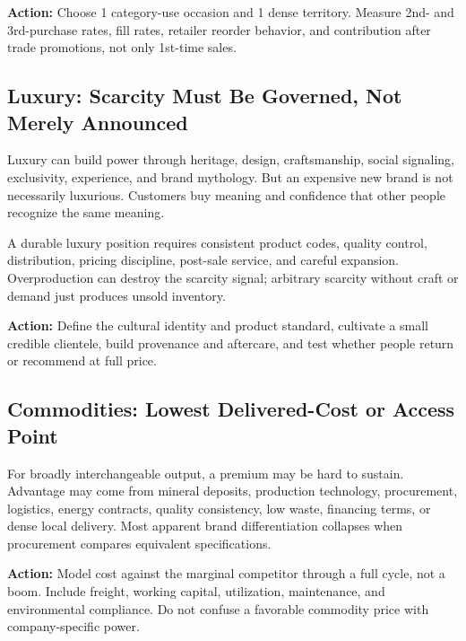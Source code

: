 \vspace{0.5em}
\noindent\textbf{Action:} Choose 1 category-use occasion and 1 dense territory. Measure 2nd- and 3rd-purchase rates, fill rates, retailer reorder behavior, and contribution after trade promotions, not only 1st-time sales.

\subsection{Luxury: Scarcity Must Be Governed, Not Merely Announced}
\label{sec:luxury_scarcity_governed}

Luxury can build power through heritage, design, craftsmanship, social signaling, exclusivity, experience, and brand mythology. But an expensive new brand is not necessarily luxurious. Customers buy meaning and confidence that other people recognize the same meaning.

A durable luxury position requires consistent product codes, quality control, distribution, pricing discipline, post-sale service, and careful expansion. Overproduction can destroy the scarcity signal; arbitrary scarcity without craft or demand just produces unsold inventory.

\vspace{0.5em}
\noindent\textbf{Action:} Define the cultural identity and product standard, cultivate a small credible clientele, build provenance and aftercare, and test whether people return or recommend at full price.

\subsection{Commodities: Lowest Delivered-Cost or Access Point}
\label{sec:commodities_delivered_cost}

For broadly interchangeable output, a premium may be hard to sustain. Advantage may come from mineral deposits, production technology, procurement, logistics, energy contracts, quality consistency, low waste, financing terms, or dense local delivery. Most apparent brand differentiation collapses when procurement compares equivalent specifications.

\vspace{0.5em}
\noindent\textbf{Action:} Model cost against the marginal competitor through a full cycle, not a boom. Include freight, working capital, utilization, maintenance, and environmental compliance. Do not confuse a favorable commodity price with company-specific power.

